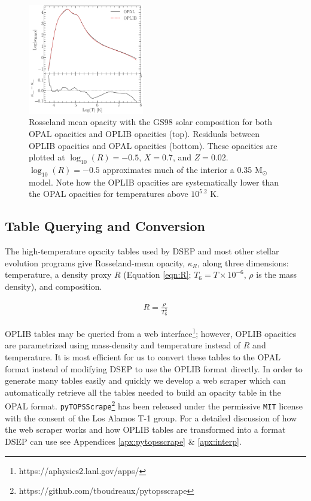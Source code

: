 \begin{figure}
	\centering
	\includegraphics[width=0.45\textwidth]{figures/jaoOpacity/OpacityComparision.pdf}
	\caption{Rosseland mean opacity with the GS98 solar composition for both
	OPAL opacities and OPLIB opacities (top). Residuals between OPLIB opacities
	and OPAL opacities (bottom). These opacities are plotted at $\log _{10}(R)
	= -0.5$, $X=0.7$, and $Z=0.02$. $\log _{10}(R)=-0.5$ approximates
	much of the interior a 0.35 M$_{\odot}$ model. Note how the OPLIB
	opacities are systematically lower than the OPAL opacities for temperatures
	above $10^{5.2}$ K.}
	\label{fig:opacComp}
\end{figure}

\subsection{Table Querying and Conversion}
The high-temperature opacity tables used by DSEP and most other stellar
evolution programs give Rosseland-mean opacity, $\kappa_{R}$, along three
dimensions: temperature, a density proxy $R$ (Equation \ref{eqn:R}; $T_{6} =
T\times10^{-6}$, $\rho$ is the mass density), and composition. 

\begin{align} \label{eqn:R}
	R = \frac{\rho}{T_{6}^{3}}
\end{align}

OPLIB tables may be queried from a web
interface\footnote{https://aphysics2.lanl.gov/apps/}; however, OPLIB opacities
are parametrized using mass-density and temperature instead of $R$ and
temperature. It is most efficient for us to convert these tables to the OPAL
format instead of modifying DSEP to use the OPLIB format directly. In order to
generate many tables easily and quickly we develop a web scraper
\citep[\texttt{pyTOPSScrape},][]{Boudreaux22} which can automatically retrieve
all the tables needed to build an opacity table in the OPAL format.
\texttt{pyTOPSScrape}\footnote{https://github.com/tboudreaux/pytopsscrape} has
been released under the permissive \texttt{MIT} license with the consent of the
Los Alamos T-1 group. For a detailed discussion of how the web scraper works
and how OPLIB tables are transformed into a format DSEP can use see Appendices
\ref{apx:pytopsscrape} \& \ref{apx:interp}.

